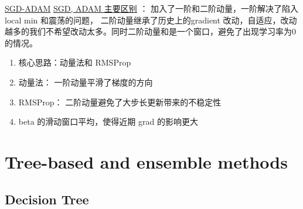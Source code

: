 \documentclass[12pt]{article}
\numberwithin{theorem}{section} %
\numberwithin{definition}{section} %
\numberwithin{assumption}{section} %
\numberwithin{lemma}{section} %
\numberwithin{remark}{section} %
\numberwithin{prop}{section} %
\numberwithin{corollary}{section} %
\numberwithin{example}{section} %
\numberwithin{question}{section} %
\numberwithin{problem}{section} %
\numberwithin{conjecture}{section} %
\numberwithin{append}{section} %
\numberwithin{property}{section} %
\begin{document}
\begin{CJK}{UTF8}{gbsn}
\href{https://zhuanlan.zhihu.com/p/32626442}{SGD-ADAM} 
\href{https://zhuanlan.zhihu.com/p/32488889}{SGD, ADAM 主要区别} ： 加入了一阶和二阶动量，一阶解决了陷入local min 和震荡的问题， 二阶动量继承了历史上的gradient 改动，自适应，改动越多的我们不希望改动太多。同时二阶动量和是一个窗口，避免了出现学习率为0的情况。

\begin{enumerate}
	\item 核心思路：动量法和 RMSProp 
	\item 动量法： 一阶动量平滑了梯度的方向
	\item RMSProp： 二阶动量避免了大步长更新带来的不稳定性
	\item beta 的滑动窗口平均，使得近期 grad 的影响更大
\end{enumerate}



\section{Tree-based and ensemble methods}

\subsection{Decision Tree}


\end{CJK}
\end{document}
